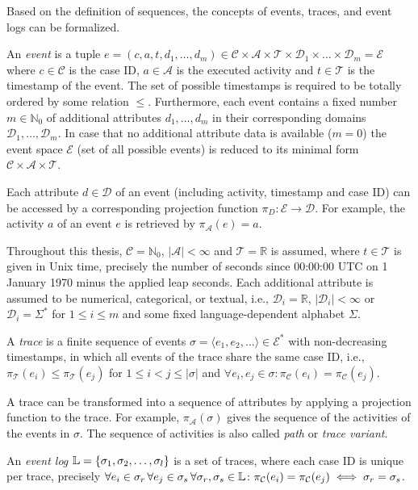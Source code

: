 Based on the definition of sequences, the concepts of events, traces, and event logs can be formalized.
\begin{definition}[Event]
An  \textit{event} is a tuple $e = (c,a,t,d_1,\dots, d_m) \in \mathcal{C} \times \mathcal{A}  \times \mathcal{T} \times \mathcal{D}_1 \times \dots \times \mathcal{D}_m =  \mathcal{E}$ where  $c \in \mathcal{C} $ is the case ID, $a \in \mathcal{A}$ is the executed activity and $t \in \mathcal{T}$ is the timestamp of the event.
The set of possible timestamps is required to be totally ordered by some relation $\leq$.
Furthermore, each event contains a fixed number $m \in \mathbb{N}_0$ of additional attributes $d_1, \dots, d_m$ in their corresponding domains $\mathcal{D}_1, \dots , \mathcal{D}_m$.
In case that no additional attribute data is available ($m = 0$) the event space $\mathcal{E}$ (set of all possible events) is reduced to its minimal form $\mathcal{C} \times \mathcal{A}  \times \mathcal{T}$.
\end{definition}
Each attribute $d \in \mathcal{D}$ of an event (including activity, timestamp and case ID) can be accessed by a corresponding projection function $\pi_D \colon \mathcal{E} \to \mathcal{D}$.
For example, the activity $a$ of an event $e$ is retrieved by $\pi_\mathcal{A}(e) = a$.

Throughout this thesis,  $\mathcal{C} = \mathbb{N}_0$, $|\mathcal{A}| < \infty$ and $ \mathcal{T} = \mathbb{R}$ is assumed, where $t \in \mathcal{T}$ is given in Unix time, precisely the number of seconds since 00:00:00 UTC on 1 January 1970 minus the applied leap seconds.
Each additional attribute is assumed to be numerical, categorical, or textual, i.e., $\mathcal{D}_i = \mathbb{R}$, $|\mathcal{D}_i| < \infty$ or $\mathcal{D}_i = \Sigma^\ast$  for $1 \leq i \leq m$ and some fixed language-dependent alphabet $\Sigma$.
\begin{definition}[Trace]
	A \textit{trace} is a finite sequence of events $\sigma = \langle e_1, e_2, \dots\rangle \in  \mathcal{E}^\ast$ with non-decreasing timestamps, in which all events of the trace share the same case ID, i.e., $\pi_\mathcal{T} (e_i) \leq \pi_\mathcal{T} (e_j) $ for $1 \leq i < j \leq |\sigma|$ and $\forall e_i, e_j \in \sigma \colon \pi_\mathcal{C}(e_i) =  \pi_\mathcal{C}(e_j)$.
\end{definition}
A trace can be transformed into a sequence of attributes by applying a projection function to the trace.
For example, $\pi_\mathcal{A}(\sigma)$ gives the sequence of the activities of the events in $\sigma$.
The sequence of activities is also called \textit{path} or \textit{trace variant}.
\begin{definition}
	An \textit{event log} $\mathbb{L} = \{ \sigma_1, \sigma _2, \dots, \sigma_l \}$ is a set of traces, where each case ID is unique per trace, precisely $\forall e_i \in \sigma_r \,  \forall e_j \in \sigma_s \, \forall  \sigma_r, \sigma_s \in \mathbb{L} \colon \pi_\mathcal{C}(e_i) = \pi_\mathcal{C}(e_j) \iff \sigma_r = \sigma_s$.
\end{definition}

